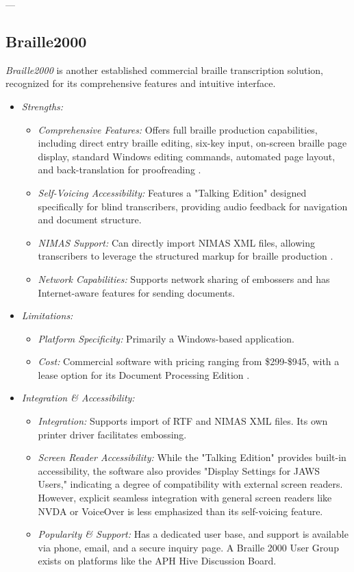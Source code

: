 ---

\subsection{Braille2000}
\emph{Braille2000} is another established commercial braille transcription solution, recognized for its comprehensive features and intuitive interface.

\begin{itemize}
    \item \emph{Strengths:}
    \begin{itemize}
        \item \emph{Comprehensive Features:} Offers full braille production capabilities, including direct entry braille editing, six-key input, on-screen braille page display, standard Windows editing commands, automated page layout, and back-translation for proofreading \cite{Braille2000Intro}.
        \item \emph{Self-Voicing Accessibility:} Features a "Talking Edition" designed specifically for blind transcribers, providing audio feedback for navigation and document structure.
        \item \emph{NIMAS Support:} Can directly import NIMAS XML files, allowing transcribers to leverage the structured markup for braille production \cite{Braille2000Docs}.
        \item \emph{Network Capabilities:} Supports network sharing of embossers and has Internet-aware features for sending documents.
    \end{itemize}
    \item \emph{Limitations:}
    \begin{itemize}
        \item \emph{Platform Specificity:} Primarily a Windows-based application.
        \item \emph{Cost:} Commercial software with pricing ranging from \$299-\$945, with a lease option for its Document Processing Edition \cite{Braille2000Pricing}.
    \end{itemize}
    \item \emph{Integration \& Accessibility:}
    \begin{itemize}
        \item \emph{Integration:} Supports import of RTF and NIMAS XML files. Its own printer driver facilitates embossing.
        \item \emph{Screen Reader Accessibility:} While the "Talking Edition" provides built-in accessibility, the software also provides "Display Settings for JAWS Users," indicating a degree of compatibility with external screen readers. However, explicit seamless integration with general screen readers like NVDA or VoiceOver is less emphasized than its self-voicing feature.
        \item \emph{Popularity \& Support:} Has a dedicated user base, and support is available via phone, email, and a secure inquiry page. A Braille 2000 User Group exists on platforms like the APH Hive Discussion Board.
    \end{itemize}
\end{itemize}

